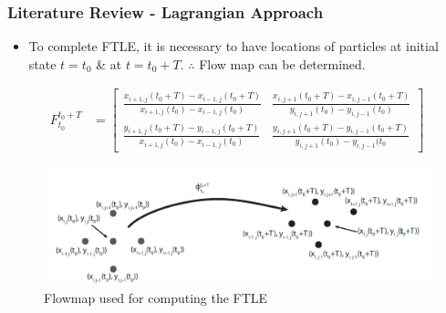 \documentclass[../presentation.tex]{subfiles}
\begin{document}
\begin{frame}
  \frametitle{Literature Review - Lagrangian Approach}

  \begin{itemize}
    \item To complete FTLE, it is necessary to have locations of particles at initial state \(t = t_0\) \& at \(t = t_0 + T\). \(\therefore\) Flow map can be determined.
  \end{itemize}

  {\tiny
  \begin{equation}
    \begin{aligned}
      {F_{t_0}^{t_0 + T}} &= \begin{bmatrix}
        \frac{x_{i + 1, j}(t_0 + T) - x_{i - 1, j}(t_0 + T)}{x_{i+1, j}(t_0) - x_{i-1, j}(t_0)} & \frac{x_{i, j+1}(t_0 + T) - x_{i,j-1}(t_0 + T)}{y_{i,j+1}(t_0) - y_{i,j-1}(t_0)} \\[12pt]
        
        \frac{y_{i+1, j}(t_0 + T) - y_{i-1, j}(t_0 + T)}{x_{i+1,j}(t_0) - x_{i-1, j}(t_0)} & \frac{y_{i,j+1}(t_0 + T) - y_{i, j - 1}(t_0 + T)}{y_{i, j+1}(t_0) - y_{i, j-1}(t_0}
      \end{bmatrix}
    \end{aligned}
  \end{equation}
  }

  \begin{figure}[H]
    \centering
    \includegraphics[width=0.8\linewidth]{images/image_1.png}
    \caption{Flowmap used for computing the FTLE}
    \label{fig:fig-1}
  \end{figure}
\end{frame}
\end{document}
